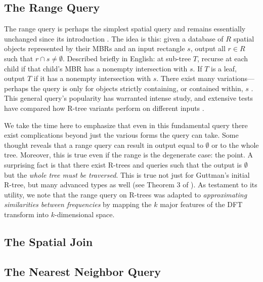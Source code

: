 \subsection{The Range Query}
The range query is perhaps the simplest spatial query and remains essentially unchanged since its introduction \cite{guttman84}.
The idea is this: given a database of $R$ spatial objects represented by their MBRs and an input rectangle $s$, output all $r\in R$ such that $r\cap s\neq\emptyset$.
Described briefly in English: at sub-tree $T$, recurse at each child if that child's MBR has a nonempty intersection with $s$.
If $T$ is a leaf, output $T$ if it has a nonempty intersection with $s$.
There exist many variations---perhaps the query is only for objects strictly containing, or contained within, $s$ \cite{gaedegunther95}.
This general query's popularity has warranted intense study, and extensive tests have compared how R-tree variants perform on different inputs \cite{papadiassellistheodoridisegenhofer95}.

We take the time here to emphasize that even in this fundamental query there exist complications beyond just the various forms the query can take.
Some thought reveals that a range query can result in output equal to $\emptyset$ or to the whole tree.
Moreover, this is true even if the range is the degenerate case: the point.
A surprising fact is that there exist R-trees and queries such that the output is $\emptyset$ but the \emph{whole tree must be traversed}.
This is true not just for Guttman's initial R-tree, but many advanced types as well (see Theorem 3 of \cite{argeberghaverkortyi04}).
As testament to its utility, we note that the range query on R-trees was adapted to \emph{approximating similarities between frequencies} \cite{agrawalfaloutsosswami93} by mapping the $k$ major features of the DFT transform into $k$-dimensional space.
\subsection{The Spatial Join}
\subsection{The Nearest Neighbor Query}
